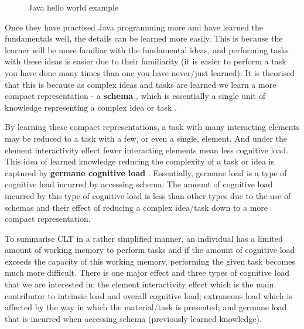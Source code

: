 \documentclass[12pt]{article}
\newcommand{\keyword}[1]{%
    \textbf{#1}%
}
\begin{document}
\begin{figure}
    \centering
    
    \caption{Java hello world example}
    \label{fig:java_hello_world}
\end{figure}

Once they have practised Java programming more and have learned the fundamentals well, the details can be learned more easily. This is because the learner will be more familiar with the fundamental ideas, and performing tasks with these ideas is easier due to their familiarity (it is easier to perform a task you have done many times than one you have never/just learned). It is theorised that this is because as complex ideas and tasks are learned we learn a more compact representation - a \keyword{schema}, which is essentially a single unit of knowledge representing a complex idea or task \citep{axelrod1973schema, abelson1981psychological, bartlett1995remembering}. 

By learning these compact representations, a task with many interacting elements may be reduced to a task with a few, or even a single, element. And under the element interactivity effect fewer interacting elements mean less cognitive load. This idea of learned knowledge reducing the complexity of a task or idea is captured by \keyword{germane cognitive load}. Essentially, germane load is a type of cognitive load incurred by accessing schema. The amount of cognitive load incurred by this type of cognitive load is less than other types due to the use of schemas and their effect of reducing a complex idea/task down to a more compact representation.

To summarise CLT in a rather simplified manner, an individual has a limited amount of working memory to perform tasks and if the amount of cognitive load exceeds the capacity of this working memory, performing the given task becomes much more difficult. There is one major effect and three types of cognitive load that we are interested in: the element interactivity effect which is the main contributor to intrinsic load and overall cognitive load; extraneous load which is affected by the way in which the material/task is presented; and germane load that is incurred when accessing schema (previously learned knowledge).
\end{document}
